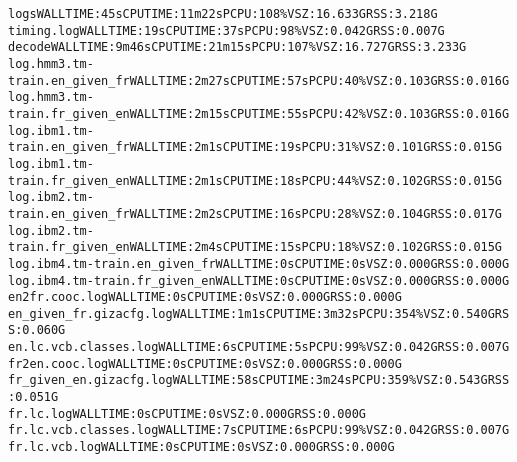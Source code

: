 \documentclass[11pt,letterpaper]{article}
\begin{document}
\begin{tiny}
\begin{alltt}
         logs                                             WALL TIME: 45s      CPU TIME: 11m22s    PCPU: 108\%   VSZ: 16.633G   RSS: 3.218G
         timing.log                                       WALL TIME: 19s      CPU TIME: 37s       PCPU: 98\%    VSZ: 0.042G    RSS: 0.007G
      decode                                              WALL TIME: 9m46s    CPU TIME: 21m15s    PCPU: 107\%   VSZ: 16.727G   RSS: 3.233G
         log.hmm3.tm-train.en_given_fr                    WALL TIME: 2m27s    CPU TIME: 57s       PCPU: 40\%    VSZ: 0.103G    RSS: 0.016G
         log.hmm3.tm-train.fr_given_en                    WALL TIME: 2m15s    CPU TIME: 55s       PCPU: 42\%    VSZ: 0.103G    RSS: 0.016G
         log.ibm1.tm-train.en_given_fr                    WALL TIME: 2m1s     CPU TIME: 19s       PCPU: 31\%    VSZ: 0.101G    RSS: 0.015G
         log.ibm1.tm-train.fr_given_en                    WALL TIME: 2m1s     CPU TIME: 18s       PCPU: 44\%    VSZ: 0.102G    RSS: 0.015G
         log.ibm2.tm-train.en_given_fr                    WALL TIME: 2m2s     CPU TIME: 16s       PCPU: 28\%    VSZ: 0.104G    RSS: 0.017G
         log.ibm2.tm-train.fr_given_en                    WALL TIME: 2m4s     CPU TIME: 15s       PCPU: 18\%    VSZ: 0.102G    RSS: 0.015G
         log.ibm4.tm-train.en_given_fr                    WALL TIME: 0s       CPU TIME: 0s                     VSZ: 0.000G    RSS: 0.000G
         log.ibm4.tm-train.fr_given_en                    WALL TIME: 0s       CPU TIME: 0s                     VSZ: 0.000G    RSS: 0.000G
            en2fr.cooc.log                                WALL TIME: 0s       CPU TIME: 0s                     VSZ: 0.000G    RSS: 0.000G
            en_given_fr.gizacfg.log                       WALL TIME: 1m1s     CPU TIME: 3m32s     PCPU: 354\%   VSZ: 0.540G    RSS: 0.060G
            en.lc.vcb.classes.log                         WALL TIME: 6s       CPU TIME: 5s        PCPU: 99\%    VSZ: 0.042G    RSS: 0.007G
            fr2en.cooc.log                                WALL TIME: 0s       CPU TIME: 0s                     VSZ: 0.000G    RSS: 0.000G
            fr_given_en.gizacfg.log                       WALL TIME: 58s      CPU TIME: 3m24s     PCPU: 359\%   VSZ: 0.543G    RSS: 0.051G
            fr.lc.log                                     WALL TIME: 0s       CPU TIME: 0s                     VSZ: 0.000G    RSS: 0.000G
            fr.lc.vcb.classes.log                         WALL TIME: 7s       CPU TIME: 6s        PCPU: 99\%    VSZ: 0.042G    RSS: 0.007G
            fr.lc.vcb.log                                 WALL TIME: 0s       CPU TIME: 0s                     VSZ: 0.000G    RSS: 0.000G

\end{alltt}
\end{tiny}
\end{document}
